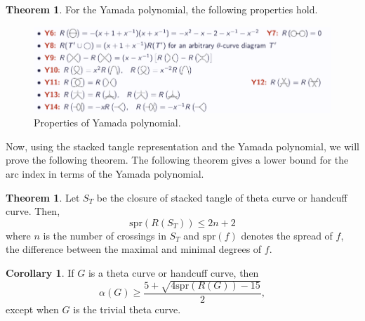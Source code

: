 \documentclass{article}
\theoremstyle{definition}
\theoremstyle{theorem}
\newtheorem{theorem}[thm]{Theorem}
\theoremstyle{proposition}
\theoremstyle{corollary}
\newtheorem{corol}[thm]{Corollary}
\begin{document}
\begin{theorem}
    For the Yamada polynomial, the following properties hold.
    \begin{figure}[h]
        \centerline{\includegraphics[width=0.75\linewidth]{yamada_property.png}}
        \caption{Properties of Yamada polynomial.}
        \label{figure_3}
    \end{figure}
\end{theorem}

Now, using the stacked tangle representation and the Yamada polynomial, we will prove the following theorem. The following theorem gives a lower bound for the arc index in terms of the Yamada polynomial.

\begin{theorem}
    Let $S_T$ be the closure of stacked tangle of theta curve or handcuff curve. Then,
    \[ \text{spr}(R(S_T)) \leq 2n+2 \]
    where $n$ is the number of crossings in $S_T$ and $\mathrm{spr}(f)$ denotes the spread of $f$, the difference between the maximal and minimal degrees of $f$.
\end{theorem}

\begin{corol}
    If $G$ is a theta curve or handcuff curve, then
    \[ \alpha(G) \geq \frac{5 + \sqrt{4 \mathrm{spr}(R(G)) - 15}}{2}, \]
    except when $G$ is the trivial theta curve.
\end{corol}
\end{document}

